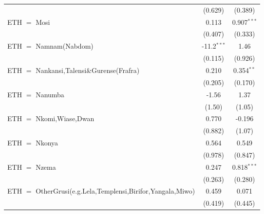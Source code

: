 \begin{table}[htbp!]
\begin{adjustbox}{width = 1\textwidth, max height = 0.95\textheight, center}
\begin{threeparttable}[b]
\begin{tabular}{lcc}
                                                                                      & (0.629)       & (0.389)\\   
            ETH $=$ Mosi                                                              & 0.113         & 0.907$^{***}$\\   
                                                                                      & (0.407)       & (0.333)\\   
            ETH $=$ Namnam(Nabdom)                                                    & -11.2$^{***}$ & 1.46\\   
                                                                                      & (0.115)       & (0.926)\\   
            ETH $=$ Nankansi,Talensi\&Gurense(Frafra) & 0.210 & 0.354$^{**}$\\ 
                                                                                      & (0.205)       & (0.170)\\   
            ETH $=$ Nanumba                                                           & -1.56         & 1.37\\   
                                                                                      & (1.50)        & (1.05)\\   
            ETH $=$ Nkomi,Wiase,Dwan                                                  & 0.770         & -0.196\\   
                                                                                      & (0.882)       & (1.07)\\   
            ETH $=$ Nkonya                                                            & 0.564         & 0.549\\   
                                                                                      & (0.978)       & (0.847)\\   
            ETH $=$ Nzema                                                             & 0.247         & 0.818$^{***}$\\   
                                                                                      & (0.263)       & (0.280)\\   
            ETH $=$ OtherGrusi(e.g.Lela,Templensi,Birifor,Yangala,Miwo)               & 0.459         & 0.071\\   
                                                                                      & (0.419)       & (0.445)\\   

\end{tabular}
\end{threeparttable}
\end{adjustbox}
\end{table}
